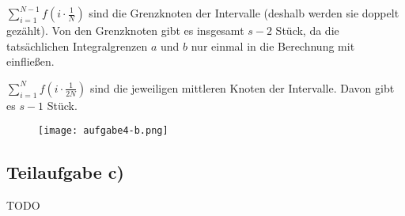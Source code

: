 $\sum_{i=1}^{N-1} f(i \cdot \frac{1}{N})$  sind die Grenzknoten der Intervalle
 (deshalb werden sie doppelt gezählt). Von den Grenzknoten gibt es
insgesamt $s-2$ Stück, da die tatsächlichen Integralgrenzen $a$ und $b$
nur einmal in die Berechnung mit einfließen.

$\sum_{i=1}^N f(i \cdot \frac{1}{2N})$ sind die jeweiligen
mittleren Knoten der Intervalle. Davon gibt es $s-1$ Stück.

\begin{figure}[h]
    \centering
    \texttt{[image: aufgabe4-b.png]}
\end{figure}

\subsection*{Teilaufgabe c)}
TODO
